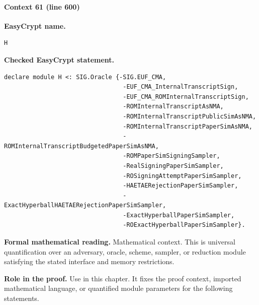 \paragraph{Context 61 (line 600)}
\noindent\textbf{EasyCrypt name.}
\begin{lstlisting}[language=EasyCrypt,basicstyle=\ttfamily\scriptsize]
H
\end{lstlisting}
\noindent\textbf{Checked EasyCrypt statement.}
\begin{lstlisting}[language=EasyCrypt,basicstyle=\ttfamily\scriptsize]
declare module H <: SIG.Oracle {-SIG.EUF_CMA,
                                 -EUF_CMA_InternalTranscriptSign,
                                 -EUF_CMA_ROMInternalTranscriptSign,
                                 -ROMInternalTranscriptAsNMA,
                                 -ROMInternalTranscriptPublicSimAsNMA,
                                 -ROMInternalTranscriptPaperSimAsNMA,
                                 -ROMInternalTranscriptBudgetedPaperSimAsNMA,
                                 -ROMPaperSimSigningSampler,
                                 -RealSigningPaperSimSampler,
                                 -ROSigningAttemptPaperSimSampler,
                                 -HAETAERejectionPaperSimSampler,
                                 -ExactHyperballHAETAERejectionPaperSimSampler,
                                 -ExactHyperballPaperSimSampler,
                                 -ROExactHyperballPaperSimSampler}.
\end{lstlisting}
\noindent\textbf{Formal mathematical reading.}
Mathematical context. This is universal quantification over an adversary, oracle, scheme, sampler, or reduction module satisfying the stated interface and memory restrictions.

\noindent\textbf{Role in the proof.}
Use in this chapter. It fixes the proof context, imported mathematical language, or quantified module parameters for the following statements.

